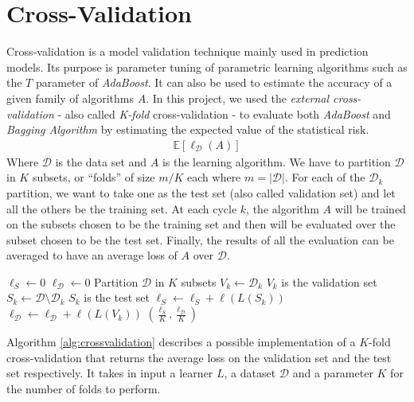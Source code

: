 
\chapter{Cross-Validation}
Cross-validation is a model validation technique mainly used in prediction models. Its purpose is parameter tuning of parametric learning algorithms such as the $T$ parameter of \textit{AdaBoost}. It can also be used to estimate the accuracy of a given family of algorithms $A$. In this project, we used the \textit{external cross-validation} - also called \textit{K-fold} cross-validation - to evaluate both  \textit{AdaBoost} and \textit{Bagging Algorithm} by estimating the expected value of the statistical risk.
\begin{align*}
	\mathbb{E}[\ell_{\mathcal{D}}(A)]
\end{align*}
Where $\mathcal{D}$ is the data set and $A$ is the learning algorithm. We have to partition $\mathcal{D}$ in $K$ subsets, or ``folds'' of size $m/K$ each where $m = |\mathcal{D}|$. For each of the $\mathcal{D}_{k}$ partition, we want to take one as the test set (also called validation set) and let all the others be the training set. At each cycle $k$, the algorithm $A$ will be trained on the subsets chosen to be the training set and then will be evaluated over the subset chosen to be the test set. Finally, the results of all the evaluation can be averaged to have an average loss of $A$ over $\mathcal{D}$.

\begin{algorithm}[]
	\caption{}
	\label{alg:crossvalidation}
	\begin{algorithmic}[1]
		\State $\ell_{S} \gets 0$
		\State $\ell_{\mathcal{D}} \gets 0$
		\State Partition $\mathcal{D}$ in $K$ subsets
			\State $V_{k} \gets \mathcal{D}_{k}$ \Comment $V_{k}$ is the validation set
			\State $S_{k} \gets \mathcal{D}\setminus\mathcal{D}_{k}$ \Comment $S_{k}$ is the test set
			\State $\ell_{S} \gets \ell_{S} + \ell(L(S_{k}))$
			\State $\ell_{\mathcal{D}} \gets \ell_{\mathcal{D}} + \ell(L(V_{k})) $
		\EndFor
		\Return $(\frac{\ell_{S}}{K},\frac{\ell_{\mathcal{D}}}{K})$
		\EndProcedure
	\end{algorithmic}
\end{algorithm}

Algorithm \ref{alg:crossvalidation} describes a possible implementation of a $K$-fold cross-validation that returns the average loss on the validation set and the test set respectively. It takes in input a learner $L$, a dataset $\mathcal{D}$ and a parameter $K$ for the number of folds to perform.